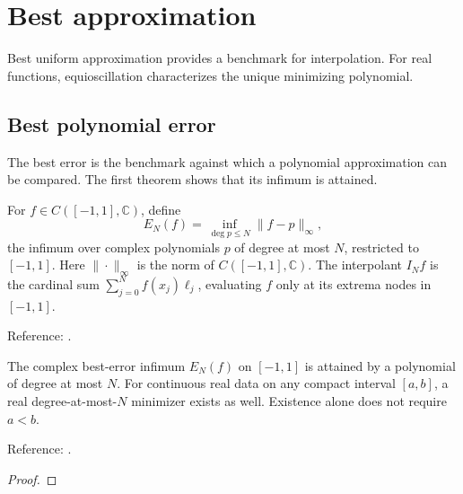 \chapter{Best approximation}\label{chap:best}


Best uniform approximation provides a benchmark for interpolation. For real functions, equioscillation characterizes the unique minimizing polynomial.

\section{Best polynomial error}\label{sec:textbook-best-best}

The best error is the benchmark against which a polynomial approximation can be compared. The first theorem shows that its infimum is attained.

\begin{definition}
\label{def:best-uniform-error}
\leanok
For $f\in C([-1,1],\mathbb C)$, define
\[
 E_N(f)=\inf_{\deg p\le N}\|f-p\|_\infty,
\]
the infimum over complex polynomials $p$ of degree at most $N$, restricted to
$[-1,1]$. Here $\|\cdot\|_\infty$ is the norm of $C([-1,1],\mathbb C)$. The interpolant $I_N f$ is the cardinal sum $\sum_{j=0}^N f(x_j)\ell_j$, evaluating $f$ only at its extrema nodes in $[-1,1]$.

Reference: \cite[Chapter 16]{atap}.
\end{definition}

\begin{theorem}
\label{thm:best-error-attainment}
\leanok
The complex best-error infimum $E_N(f)$ on $[-1,1]$ is attained by a polynomial
of degree at most $N$. For continuous real data on any compact interval $[a,b]$,
a real degree-at-most-$N$ minimizer exists as well. Existence alone does not
require $a<b$.

Reference: \cite[Theorem 10.1]{atap}.
\end{theorem}
\begin{proof}
\leanok
\end{proof}

